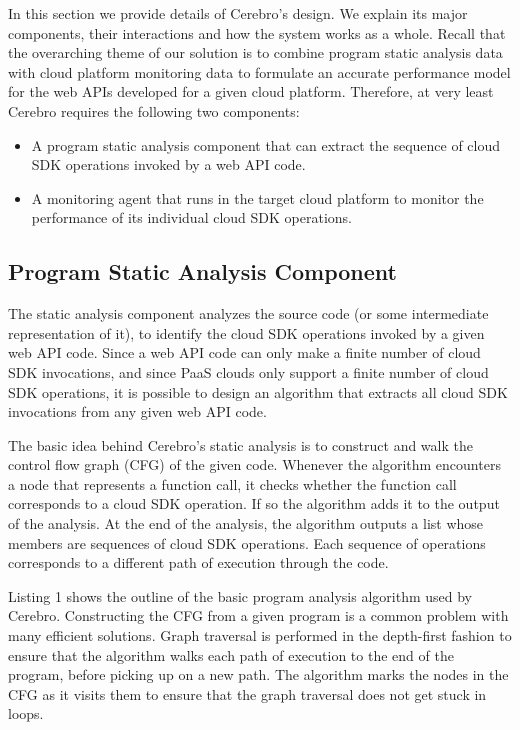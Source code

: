 In this section we provide details of Cerebro's design. We explain its major components, their interactions and how the 
system works as a whole. Recall that the overarching theme of our solution is to combine program
static analysis data with cloud platform monitoring data to formulate an accurate performance model for the 
web APIs developed for a given cloud platform. Therefore, at very least Cerebro requires the following two components:

\begin{itemize}
\item A program static analysis component that can extract the sequence of cloud SDK operations invoked by a web API
code.
\item A monitoring agent that runs in the target cloud platform to monitor the performance of its individual cloud SDK
operations.
\end{itemize}
 
 \subsection{Program Static Analysis Component}
 The static analysis component analyzes the source code (or some intermediate representation of it), to identify
 the cloud SDK operations invoked by a given web API code. Since a web API code can only make a finite
 number of cloud SDK invocations, and since PaaS clouds only support a finite number of cloud
 SDK operations, it is possible to design an algorithm that
 extracts all cloud SDK invocations from any given web API code. 

The basic idea behind Cerebro's static analysis is to construct and walk the
 control flow graph (CFG) of the given code. Whenever the algorithm encounters a node that represents a function call,
 it checks whether the function call corresponds to a cloud SDK operation. If so the algorithm
adds it to the output of the analysis. At the end of the analysis, the algorithm outputs a list whose members are
sequences of cloud SDK operations. Each sequence of operations corresponds to a different
path of execution through the code.

Listing 1 shows the outline of the basic program analysis algorithm used by Cerebro. 
Constructing the CFG from a given program
is a common problem with many efficient solutions. Graph traversal is performed in the depth-first 
fashion to ensure that the algorithm walks each path of execution to the end of the program, before picking up on
a new path. The algorithm marks the nodes in the CFG as it visits them to ensure that the graph traversal does not get stuck in loops. 

